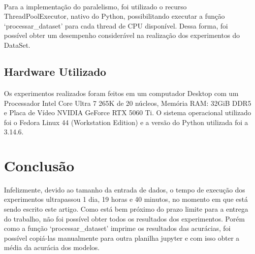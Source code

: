 \documentclass[12pt]{article}
\begin{document}


\paragraph{}Para a implementação do paralelismo, foi utilizado o recurso ThreadPoolExecutor, nativo do Python, possibilitando executar a função ‘processar\_dataset’ para cada thread de CPU disponível. Dessa forma, foi possível obter um desempenho considerável na realização dos experimentos do DataSet.



\subsection{Hardware Utilizado}

\paragraph{}Os experimentos realizados foram feitos em um computador Desktop com um Processador Intel Core Ultra 7 265K de 20 núcleos, Memória RAM: 32GiB DDR5 e Placa de Vídeo NVIDIA GeForce RTX 5060 Ti. O sistema operacional utilizado foi o Fedora Linux 44 (Workstation Edition) e a versão do Python utilizada foi a 3.14.6.

\section{Conclusão}

\paragraph{}Infelizmente, devido ao tamanho da entrada de dados, o tempo de execução dos experimentos ultrapassou 1 dia, 19 horas e 40 minutos, no momento em que está sendo escrito este artigo. Como está bem próximo do prazo limite para a entrega do trabalho, não foi possível obter todos os resultados dos experimentos. Porém como a função ‘processar_dataset’ imprime os resultados das acurácias, foi possível copiá-las manualmente para outra planilha jupyter e com isso obter a média da acurácia dos modelos.
\end{document}
